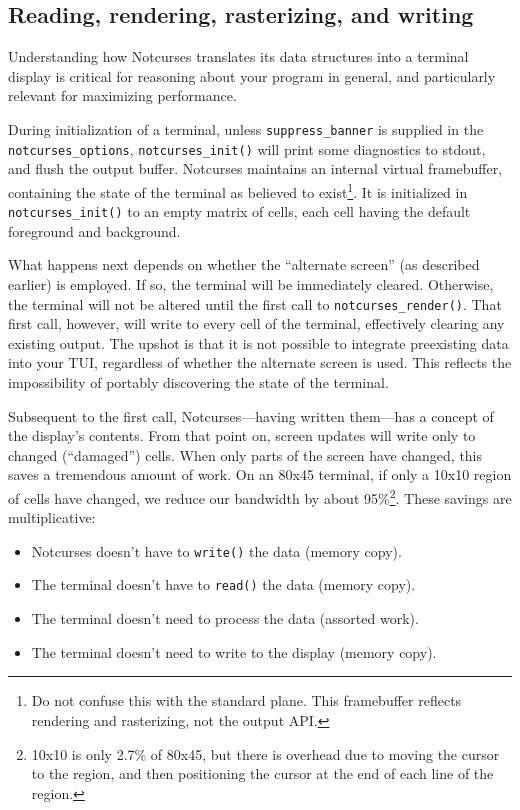 \documentclass[letterpaper,10pt]{article}
\newenvironment{denseitemize}{
  \begin{itemize}
      \setlength{\itemsep}{0pt}
}{
  \end{itemize}
}
\begin{document}
\subsection{Reading, rendering, rasterizing, and writing}
\label{sec:rendering}

Understanding how Notcurses translates its data structures into a terminal
display is critical for reasoning about your program in general, and particularly
relevant for maximizing performance.

During initialization of a terminal, unless \texttt{suppress\_banner} is supplied
in the \texttt{notcurses\_options}, \texttt{notcurses\_init()} will print some
diagnostics to stdout, and flush the output buffer. Notcurses maintains an
internal virtual framebuffer, containing the state of the terminal as believed
to exist\footnote{Do not confuse this with the standard plane. This framebuffer
reflects rendering and rasterizing, not the output API.}. It is initialized in
\texttt{notcurses\_init()} to an empty matrix of cells, each cell having the
default foreground and background.

What happens next depends on whether the ``alternate screen'' (as described
earlier) is employed. If so, the terminal will be immediately cleared.
Otherwise, the terminal will not be altered until the first call to
\texttt{notcurses\_render()}. That first call, however, will write to every
cell of the terminal, effectively clearing any existing output. The upshot is
that it is not possible to integrate preexisting data into your TUI, regardless
of whether the alternate screen is used. This reflects the impossibility of
portably discovering the state of the terminal.

Subsequent to the first call, Notcurses---having written them---has a concept
of the display's contents. From that point on, screen updates will write only
to changed (``damaged'') cells. When only parts of the screen have changed,
this saves a tremendous amount of work. On an 80x45 terminal, if only a 10x10
region of cells have changed, we reduce our bandwidth by about
95\%\footnote{10x10 is only 2.7\% of 80x45, but there is overhead due to moving
the cursor to the region, and then positioning the cursor at the end of each
line of the region.}. These savings are multiplicative:

\begin{denseitemize}
\item{Notcurses doesn't have to \texttt{write()} the data (memory copy).}
\item{The terminal doesn't have to \texttt{read()} the data (memory copy).}
\item{The terminal doesn't need to process the data (assorted work).}
\item{The terminal doesn't need to write to the display (memory copy).}
\end{denseitemize}
\end{document}
